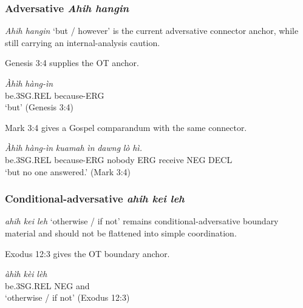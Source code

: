 \documentclass[
  11pt,
  a4paper,
]{article}
\newcommand{\tdim}[1]{\textit{#1}}
\newcommand{\tdimword}[1]{\textit{#1}}
\renewcommand{\textsc}[1]{{\footnotesize\MakeUppercase{#1}}}
\newcommand{\glossquote}[1]{`#1'}
\begin{document}
\subsubsection{\texorpdfstring{Adversative
\tdim{Ahih hangin}}{Adversative }}\label{adversative}

\tdim{Ahih hangin} \glossquote{but / however} is the current adversative
connector anchor, while still carrying an internal-analysis caution.

Genesis 3:4 supplies the OT anchor.

\begin{exe}
\ex \label{ex:coord-ahih-hangin}
\gll \tdimword{Àhìh} \tdimword{hàng-ìn} \\
     be.\textsc{3sg}.\textsc{rel} because-\textsc{erg} \\
\glt \glossquote{but} (Genesis 3:4)
\end{exe}

Mark 3:4 gives a Gospel comparandum with the same connector.

\begin{exe}
\ex \label{ex:coord-ahih-hangin-mark3-4}
\gll \tdimword{Àhìh} \tdimword{hàng-ìn} \tdimword{kuamah} \tdimword{ìn} \tdimword{dawng} \tdimword{lò} \tdimword{hì.} \\
     be.\textsc{3sg}.\textsc{rel} because-\textsc{erg} nobody \textsc{erg} receive \textsc{neg} \textsc{decl} \\
\glt \glossquote{but no one answered.} (Mark 3:4)
\end{exe}

\subsubsection{\texorpdfstring{Conditional-adversative
\tdim{ahih kei leh}}{Conditional-adversative }}\label{conditional-adversative}

\tdim{ahih kei leh} \glossquote{otherwise / if not} remains
conditional-adversative boundary material and should not be flattened
into simple coordination.

Exodus 12:3 gives the OT boundary anchor.

\begin{exe}
\ex \label{ex:coord-ahih-kei-leh}
\gll \tdimword{àhìh} \tdimword{kèi} \tdimword{lèh} \\
     be.\textsc{3sg}.\textsc{rel} \textsc{neg} and \\
\glt \glossquote{otherwise / if not} (Exodus 12:3)
\end{exe}
\end{document}
